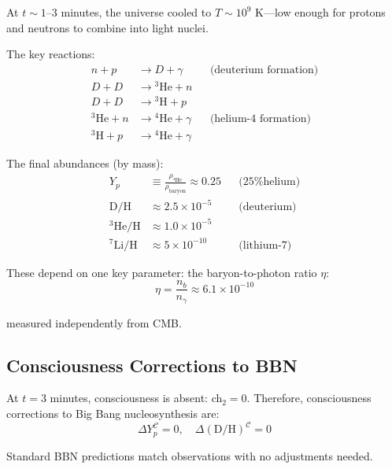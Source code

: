 \begin{level2}
At $t \sim 1\text{--}3$ minutes, the universe cooled to $T \sim 10^9$ K—low enough for protons and neutrons to combine into light nuclei\cite{wagoner1967,burles2001}.

The key reactions:
\begin{align}
n + p &\to D + \gamma && \text{(deuterium formation)} \\
D + D &\to {}^3\text{He} + n && \\
D + D &\to {}^3\text{H} + p && \\
{}^3\text{He} + n &\to {}^4\text{He} + \gamma && \text{(helium-4 formation)} \\
{}^3\text{H} + p &\to {}^4\text{He} + \gamma &&
\end{align}

The final abundances (by mass)\cite{cyburt2016}:
\begin{align}
Y_p &\equiv \frac{\rho_{{}^4\text{He}}}{\rho_{\text{baryon}}} \approx 0.25 && \text{(25\% helium)} \\
\text{D}/\text{H} &\approx 2.5 \times 10^{-5} && \text{(deuterium)} \\
{}^3\text{He}/\text{H} &\approx 1.0 \times 10^{-5} && \\
{}^7\text{Li}/\text{H} &\approx 5 \times 10^{-10} && \text{(lithium-7)}
\end{align}

These depend on one key parameter: the baryon-to-photon ratio $\eta$:
\begin{equation}
\eta = \frac{n_b}{n_\gamma} \approx 6.1 \times 10^{-10}
\end{equation}

measured independently from CMB\cite{planck2018}.
\end{level2}

\subsection{Consciousness Corrections to BBN}

\begin{theorem}\label{thm:bbn-consciousness}
At $t = 3$ minutes, consciousness is absent: ch$_2 = 0$. Therefore, consciousness corrections to Big Bang nucleosynthesis are:
\begin{equation}
\boxed{\Delta Y_p^{\mathcal{C}} = 0, \quad \Delta(\text{D}/\text{H})^{\mathcal{C}} = 0}
\end{equation}

Standard BBN predictions match observations\cite{cyburt2016} with no adjustments needed.
\end{theorem}

